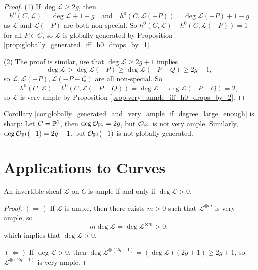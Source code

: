 \begin{proof}
  (1) If $\deg \mathcal{L} \ge 2g$, then
  \[
    h^0(C, \mathcal{L})
    = \deg \mathcal{L} + 1 - g
    \quad \text{and} \quad
    h^0(C, \mathcal{L}(-P))
    = \deg \mathcal{L}(-P) + 1 - g
  \]
  as $\mathcal{L}$ and $\mathcal{L}(-P)$ are
  both non-special. So
  $h^0(C, \mathcal{L})
    - h^0(C, \mathcal{L}(-P)) = 1$ for all
  $P \in C$, so $\mathcal{L}$ is globally generated
  by Proposition \ref{prop:globally_generated_iff_h0_drops_by_1}.

  (2) The proof is similar, use that
  $\deg \mathcal{L} \ge 2g + 1$ implies
  \[
    \deg \mathcal{L}
    > \deg \mathcal{L}(-P)
    \ge \deg \mathcal{L}(-P - Q)
    \ge 2g - 1,
  \]
  so $\mathcal{L}, \mathcal{L}(-P), \mathcal{L}(-P - Q)$ are all
  non-special. So
  \[
    h^0(C, \mathcal{L})
    - h^0(C, \mathcal{L}(-P - Q))
    = \deg \mathcal{L} - \deg \mathcal{L}(-P - Q)
    = 2,
  \]
  so $\mathcal{L}$ is very ample
  by Proposition \ref{prop:very_ample_iff_h0_drops_by_2}.
\end{proof}

\begin{remark}
  Corollary \ref{cor:globally_generated_and_very_ample_if_degree_large_enough}
  is sharp: Let $C = \mathbb{P}^1$, then
  $\deg \mathcal{O}_{\mathbb{P}^1} = 2g$, but
  $\mathcal{O}_{\mathbb{P}^1}$ is not very ample. Similarly,
  $\deg \mathcal{O}_{\mathbb{P}^1}(-1) = 2g - 1$, but
  $\mathcal{O}_{\mathbb{P}^1}(-1)$ is not globally generated.
\end{remark}

\section{Applications to Curves}

\begin{corollary}
  An invertible sheaf $\mathcal{L}$ on $C$ is
  ample if and only if $\deg \mathcal{L} > 0$.
\end{corollary}

\begin{proof}
  $(\Rightarrow)$ If $\mathcal{L}$ is ample,
  then there exists $m > 0$ such that
  $\mathcal{L}^{\otimes m}$ is very ample, so
  \[
    m \deg \mathcal{L}
    = \deg \mathcal{L}^{\otimes m} > 0,
  \]
  which implies that $\deg \mathcal{L} > 0$.

  $(\Leftarrow)$ If $\deg \mathcal{L} > 0$, then
  $\deg \mathcal{L}^{\otimes (2g + 1)} = (\deg \mathcal{L})(2g + 1) \ge 2g + 1$,
  so $\mathcal{L}^{\otimes (2g + 1)}$ is very ample.
\end{proof}

